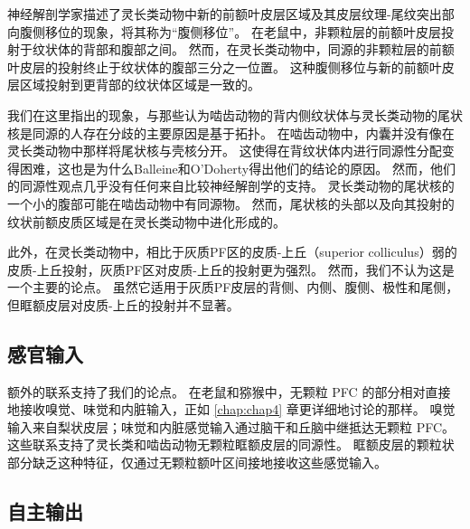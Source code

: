神经解剖学家描述了灵长类动物中新的前额叶皮层区域及其皮层纹理-尾纹突出部向腹侧移位的现象，将其称为“腹侧移位”\cite{schilman2008orbital}。
在老鼠中，非颗粒层的前额叶皮层投射于纹状体的背部和腹部之间。
然而，在灵长类动物中，同源的非颗粒层的前额叶皮层的投射终止于纹状体的腹部三分之一位置。
这种腹侧移位与新的前额叶皮层区域投射到更背部的纹状体区域是一致的。


我们在这里指出的现象，与那些认为啮齿动物的背内侧纹状体与灵长类动物的尾状核是同源的人存在分歧的主要原因是基于拓扑\cite{balleine2010human}。
在啮齿动物中，内囊并没有像在灵长类动物中那样将尾状核与壳核分开。
这使得在背纹状体内进行同源性分配变得困难，这也是为什么Balleine和O'Doherty得出他们的结论的原因。
然而，他们的同源性观点几乎没有任何来自比较神经解剖学的支持。
灵长类动物的尾状核的一个小的腹部可能在啮齿动物中有同源物。
然而，尾状核的头部以及向其投射的纹状前额皮质区域是在灵长类动物中进化形成的。


此外，在灵长类动物中，相比于灰质PF区的皮质-上丘（superior colliculus）弱的皮质-上丘投射，灰质PF区对皮质-上丘的投射更为强烈\cite{preuss1995rats}。
然而，我们不认为这是一个主要的论点。
虽然它适用于灰质PF皮层的背侧、内侧、腹侧、极性和尾侧，但眶额皮层对皮质-上丘的投射并不显著\cite{leichnetz1981prefrontal}。


\subsection{感官输入}
额外的联系支持了我们的论点。
在老鼠和猕猴中，无颗粒 PFC 的部分相对直接地接收嗅觉、味觉和内脏输入\cite{ray1993organization}，正如 \ref{chap:chap4} 章更详细地讨论的那样。
嗅觉输入来自梨状皮层；味觉和内脏感觉输入通过脑干和丘脑中继抵达无颗粒 PFC。
这些联系支持了灵长类和啮齿动物无颗粒眶额皮层的同源性。
眶额皮层的颗粒状部分缺乏这种特征，仅通过无颗粒额叶区间接地接收这些感觉输入。


\subsection{自主输出}

